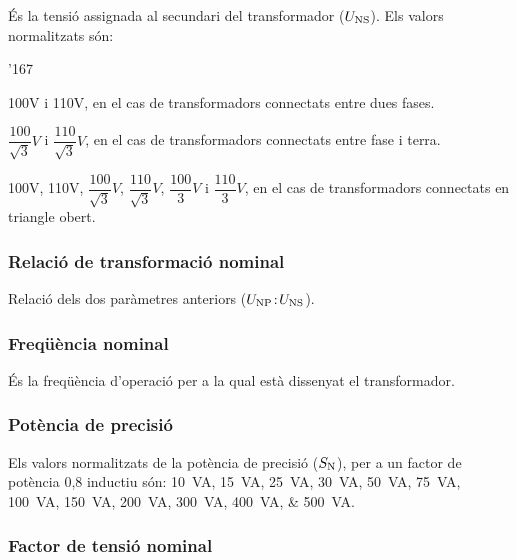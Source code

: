 \'{E}s la tensi\'{o} assignada al secundari del transformador ($U_\mathrm{NS}$).
Els valors normalitzats s\'{o}n:
\begin{dinglist}{'167}
    \item 100\unit{V} i 110\unit{V}, en el cas de transformadors connectats
    entre dues fases.
    \item $\dfrac{100}{\sqrt{3}}\unit{V}$ i
        $\dfrac{110}{\sqrt{3}}\unit{V}$, en el cas de transformadors
        connectats entre fase i terra.
    \item 100\unit{V}, 110\unit{V}, $\dfrac{100}{\sqrt{3}}\unit{V}$,
    $\dfrac{110}{\sqrt{3}}\unit{V}$, $\dfrac{100}{3}\unit{V}$   i
    $\dfrac{110}{3}\unit{V}$, en el cas de transformadors
    connectats en triangle obert.
\end{dinglist}

\subsubsection{Relaci\'{o} de transformaci\'{o} nominal}

 Relaci\'{o}  dels dos par\`{a}metres anteriors ($U_\mathrm{NP}\!:\!U_\mathrm{NS}$).

\subsubsection{Freq\"{u}\`{e}ncia nominal}

 \'{E}s la freq\"{u}\`{e}ncia d'operaci\'{o} per a la qual  est\`{a} dissenyat el transformador.

\subsubsection{Pot\`{e}ncia de precisi\'{o}}

Els valors normalitzats de la pot\`{e}ncia de precisi\'{o} ($S_\mathrm{N}$), per
a un factor de pot\`{e}ncia 0,8 inductiu s\'{o}n: \SIlist{10; 15; 25; 30; 50; 75; 100; 150;
 200; 300; 400; 500}{VA}.

\subsubsection{Factor de tensi\'{o} nominal}

